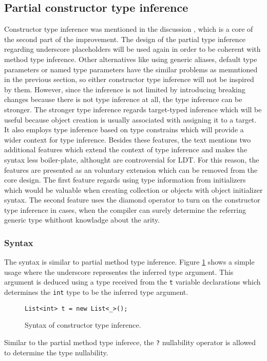 \subsection{Partial constructor type inference}

Constructor type inference was mentioned in the discussion \cite{online:CtorTInf}, which is a core of the second part of the improvement.
The design of the partial type inference regarding underscore placeholders will be used again in order to be coherent with method type inference.
Other alternatives like using generic aliases, default type parameters or named type parameters have the similar problems as memntioned in the previous section, so either constructor type inference will not be inspired by them.
However, since the inference is not limited by introducing breaking changes because there is not type inference at all, the type inference can be stronger.
The stronger type inference regards target-typed inference which will be useful because object creation is usually associated with assigning it to a target.
It also employs type inference based on type constrains which will provide a wider context for type inference.
Besides these features, the text mentions two additional features which extend the context of type inference and makes the syntax less boiler-plate, althought are controversial for \ac{LDT}.
For this reason, the features are presented as an voluntary extension which can be removed from the core design.
The first feature regards using type information from initializers which would be valuable when creating collection or objects with object initializer syntax.
The second feature uses the diamond operator to turn on the constructor type inference in cases, when the compiler can surely determine the referring generic type whithout knowladge about the arity. 

\subsubsection*{Syntax}

The syntax is similar to partial method type inference.
Figure \ref{img56:constructorTypeInferenceExample} shows a simple usage where the underscore representes the inferred type argument.
This argument is deduced using a type received from the \texttt{t} variable declarations which determines the \texttt{int} type to be the inferred type argument.
\begin{figure}[h!]
\begin{lstlisting}[style=csharp, mathescape=true]
List<int> t = new List<_>();
\end{lstlisting}
\caption{Syntax of constructor type inference.}
\label{img56:constructorTypeInferenceExample}
\end{figure}
\par
Similar to the partial method type inferece, the \texttt{?} nullability operator is allowed to determine the type nullability.

